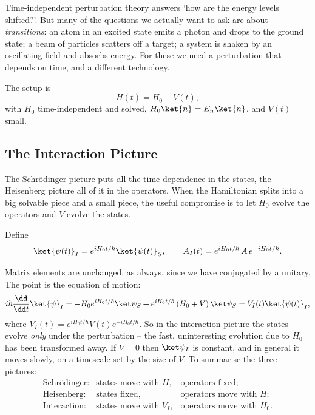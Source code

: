 Time-independent perturbation theory answers `how are the energy levels shifted?'. But many of the questions we actually want to ask are about \emph{transitions}: an atom in an excited state emits a photon and drops to the ground state; a beam of particles scatters off a target; a system is shaken by an oscillating field and absorbs energy. For these we need a perturbation that depends on time, and a different technology.

The setup is
$$
H(t) = H_0 + V(t),
$$
with $H_0$ time-independent and solved, $H_0\ket{n} = E_n\ket{n}$, and $V(t)$ small.

\subsection{The Interaction Picture}

The Schr\"odinger picture puts all the time dependence in the states, the Heisenberg picture all of it in the operators. When the Hamiltonian splits into a big solvable piece and a small piece, the useful compromise is to let $H_0$ evolve the operators and $V$ evolve the states.

\begin{definition}
    Define
    $$
    \ket{\psi(t)}_I = e^{iH_0t/\hbar}\ket{\psi(t)}_S, \qquad A_I(t) = e^{iH_0t/\hbar}\,A\,e^{-iH_0t/\hbar}.
    $$
\end{definition}

Matrix elements are unchanged, as always, since we have conjugated by a unitary. The point is the equation of motion:
$$
i\hbar\frac{\dd}{\dd t}\ket{\psi}_I = -H_0 e^{iH_0t/\hbar}\ket\psi_S + e^{iH_0 t/\hbar}\left( H_0 + V \right)\ket\psi_S = V_I(t)\ket{\psi(t)}_I,
$$
where $V_I(t) = e^{iH_0t/\hbar}V(t)e^{-iH_0t/\hbar}$. So in the interaction picture the states evolve \emph{only} under the perturbation -- the fast, uninteresting evolution due to $H_0$ has been transformed away. If $V = 0$ then $\ket\psi_I$ is constant, and in general it moves slowly, on a timescale set by the size of $V$. To summarise the three pictures:
$$
\begin{array}{lll}
\text{Schr\"odinger:} & \text{states move with } H, & \text{operators fixed};\\
\text{Heisenberg:} & \text{states fixed}, & \text{operators move with } H;\\
\text{Interaction:} & \text{states move with } V_I, & \text{operators move with } H_0.
\end{array}
$$

